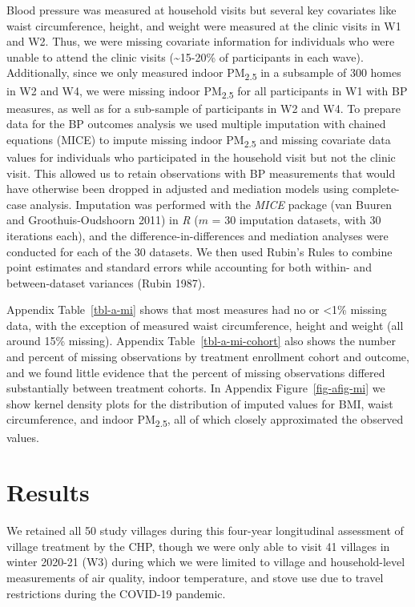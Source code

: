 \documentclass[
  letterpaper,
  DIV=11,
  numbers=noendperiod]{scrartcl}
\begin{document}
Blood pressure was measured at household visits but several key
covariates like waist circumference, height, and weight were measured at
the clinic visits in W1 and W2. Thus, we were missing covariate
information for individuals who were unable to attend the clinic visits
(\textasciitilde15-20\% of participants in each wave). Additionally,
since we only measured indoor PM\textsubscript{2.5} in a subsample of
300 homes in W2 and W4, we were missing indoor PM\textsubscript{2.5} for
all participants in W1 with BP measures, as well as for a sub-sample of
participants in W2 and W4. To prepare data for the BP outcomes analysis
we used multiple imputation with chained equations (MICE) to impute
missing indoor PM\textsubscript{2.5} and missing covariate data values
for individuals who participated in the household visit but not the
clinic visit. This allowed us to retain observations with BP
measurements that would have otherwise been dropped in adjusted and
mediation models using complete-case analysis. Imputation was performed
with the \emph{MICE} package (van Buuren and Groothuis-Oudshoorn 2011)
in \emph{R} (\(m\) = 30 imputation datasets, with 30 iterations each),
and the difference-in-differences and mediation analyses were conducted
for each of the 30 datasets. We then used Rubin's Rules to combine point
estimates and standard errors while accounting for both within- and
between-dataset variances (Rubin 1987).

Appendix Table~\ref{tbl-a-mi} shows that most
measures had no or \textless1\% missing data, with the exception of
measured waist circumference, height and weight (all around 15\%
missing). Appendix Table~\ref{tbl-a-mi-cohort} also shows the number and
percent of missing observations by treatment enrollment cohort and
outcome, and we found little evidence that the percent of missing
observations differed substantially between treatment cohorts. In
Appendix Figure~\ref{fig-afig-mi} we show kernel density plots for the
distribution of imputed values for BMI, waist circumference, and indoor
PM\textsubscript{2.5}, all of which closely approximated the observed
values.

\section{Results}\label{results-1}

We retained all 50 study villages during this four-year longitudinal
assessment of village treatment by the CHP, though we were only able to
visit 41 villages in winter 2020-21 (W3) during which we were limited to
village and household-level measurements of air quality, indoor
temperature, and stove use due to travel restrictions during the
COVID-19 pandemic.
\end{document}
